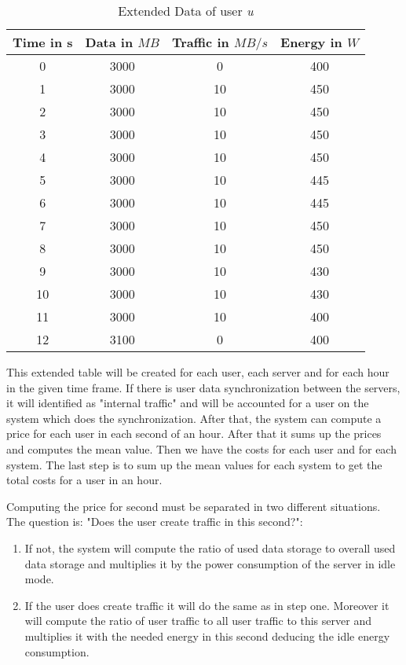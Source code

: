  
 \begin{table}
 \centering
 \caption{Extended Data of user \textit{u}}
 \begin{tabular}{|c|c|c|c|}
  \hline Time in s & Data in $MB$ & Traffic in $MB/s$ & Energy in $W$ \\ 
   \hline 0 & 3000 & 0 & 400 \\ 
  \hline 1 & 3000 & 10 & 450 \\ 
  \hline 2 & 3000 & 10 & 450 \\ 
  \hline 3 & 3000 & 10 & 450\\ 
  \hline 4 & 3000 & 10 & 450 \\ 
  \hline 5 & 3000 & 10 & 445 \\
  \hline 6 & 3000 & 10 & 445 \\ 
  \hline 7 & 3000 & 10 & 450\\ 
  \hline 8 & 3000 & 10 & 450 \\ 
  \hline 9 & 3000 & 10 & 430 \\  
  \hline 10 & 3000 & 10 & 430 \\
   \hline 11 & 3000 & 10 & 400 \\
  \hline 12 & 3100 & 0 & 400 \\  
  \hline 
  \end{tabular}
  \label{tb2} 
  \end{table}
  
  This extended table will be created for each user, each server and for each hour in the given time frame. If there is user data synchronization between the servers, it will identified as "internal traffic" and will be accounted for a user on the system which does the synchronization. After that, the system can compute a price for each user in each second of an hour. After that it sums up the prices and computes the mean value. Then we have the costs for each user and for each system. The last step is to sum up the mean values for each system to get the total costs for a user in an hour.
  
  Computing the price for second must be separated in two different situations. The question is: "Does the user create traffic in this second?":
  \begin{enumerate}
	\item
	If not, the system will compute the ratio of used data storage to overall used data storage and multiplies it by the power consumption of the server in idle mode.
	\item
	If the user does create traffic it will do the same as in step one. Moreover it will compute the ratio of user traffic to all user traffic to this server and multiplies it with the needed energy in this second deducing the idle energy consumption.
  \end{enumerate}
  
